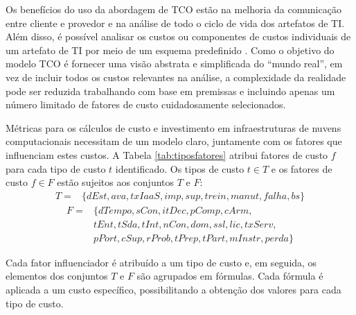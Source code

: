 \documentclass[tese,capa]{texufpel}
\begin{document}
Os benefícios do uso da abordagem de TCO estão na melhoria da comunicação entre cliente e provedor e na análise de todo o ciclo de vida dos artefatos de TI. Além disso, é possível analisar os custos ou componentes de custos individuais de um artefato de TI por meio de um esquema predefinido \cite{walterbuschEvaluatingCloudComputing2013}. Como o objetivo do modelo TCO é fornecer uma visão abstrata e simplificada do ``mundo real'', em vez de incluir todos os custos relevantes na análise, a complexidade da realidade pode ser reduzida trabalhando com base em premissas e incluindo apenas um número limitado de fatores de custo cuidadosamente selecionados.

Métricas para os cálculos de custo e investimento em infraestruturas de nuvens computacionais necessitam de um modelo claro, juntamente com os fatores que influenciam estes custos. A Tabela \ref{tab:tiposfatores} atribui fatores de custo $f$ para cada tipo de custo $t$ identificado. Os tipos de custo $t \in T$ e os fatores de custo $f \in F$ estão sujeitos aos conjuntos $T$ e $F$:
\begin{equation*}
  \begin{aligned}
    T = {} & \{dEst,ava,txIaaS,imp,sup,trein,manut,falha,bs\}
  \end{aligned}
\end{equation*}
\begin{equation*}
  \begin{aligned}
    F = {} & \{dTempo,sCon,itDec,pComp,cArm,\\ 
           & tEnt,tSda,tInt,nCon,dom,ssl,lic,txServ,\\
           & pPort,cSup,rProb,tPrep,tPart,mInstr,perda\}
  \end{aligned}
\end{equation*}

Cada fator influenciador é atribuído a um tipo de custo e, em seguida, os elementos dos conjuntos $T$ e $F$ são agrupados em fórmulas. Cada fórmula é aplicada a um custo específico, possibilitando a obtenção dos valores para cada tipo de custo.
\end{document}
